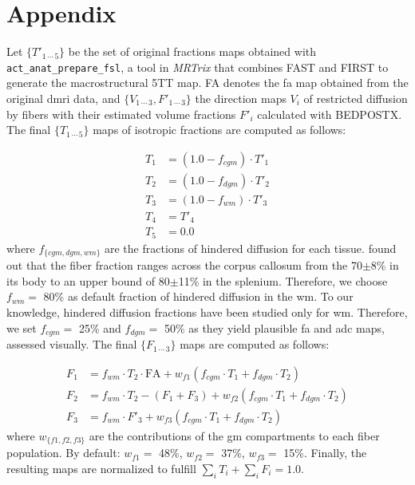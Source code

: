 \documentclass[english]{frontiers/frontiersSCNS} %
\begin{document}

\glsresetall
\linenumbers
\section*{Appendix}\label{sec:appendix}
Let $\{T'_{1\,\cdots\,5}\}$ be the set of original fractions maps obtained with \texttt{act\_anat\_prepare\_fsl}, a
  tool in \emph{MRTrix} that combines FAST \citep{zhang_segmentation_2001} and FIRST \citep{patenaude_bayesian_2011}
  to generate the macrostructural 5TT map.
FA denotes the \gls*{fa} map obtained from the original \gls*{dmri} data, and $\{V_{1\,\cdots\,3}, F'_{1\,\cdots\,3}\}$ the direction
  maps $V_i$ of restricted diffusion by fibers with their estimated volume fractions $F'_i$ calculated with BEDPOSTX.
The final $\{T_{1\,\cdots\,5}\}$ maps of isotropic fractions are computed as follows:

  \begin{align*}
  T_1 &= (1.0-f_{cgm}) \cdot T'_1 \\
  T_2 &= (1.0-f_{dgm}) \cdot T'_2 \\
  T_3 &= (1.0-f_{wm}) \cdot T'_3 \\
  T_4 &= T'_4 \\
  T_5 &= 0.0
  \end{align*}
where $f_{\{cgm, dgm, wm\}}$ are the fractions of hindered diffusion for each tissue.
\cite{sepehrband_brain_2015} found out that the fiber fraction ranges across the corpus
  callosum from the 70$\pm$8\% in its body to an upper bound of 80$\pm$11\% in the splenium.
Therefore, we choose $f_{wm} =$ 80\% as default fraction of hindered diffusion in the
  \gls*{wm}.
To our knowledge, hindered diffusion fractions have been studied only for \gls*{wm}.
Therefore, we set $f_{cgm} =$ 25\% and $f_{dgm} =$ 50\% as they yield plausible \gls*{fa}
  and \gls*{adc} maps, assessed visually.
The final $\{F_{1\,\cdots\,3}\}$ maps are computed as follows:

\begin{align*}
F_1 &= f_{wm} \cdot T_2 \cdot \text{FA} + w_{f1} (f_{cgm} \cdot T_1 + f_{dgm} \cdot T_2) \\
F_2 &= f_{wm} \cdot T_2 - (F_1 + F_3) + w_{f2} (f_{cgm} \cdot T_1 + f_{dgm} \cdot T_2) \\
F_3 &= f_{wm} \cdot F'_3 + w_{f3} (f_{cgm} \cdot T_1 + f_{dgm} \cdot T_2)
\end{align*}
where $w_{\{f1, f2, f3\}}$ are the contributions of the \gls*{gm} compartments to each fiber population.
By default: $w_{f1} = $ 48\%, $w_{f2} = $ 37\%, $w_{f3} = $ 15\%.
Finally, the resulting maps are normalized to fulfill $\sum_i T_i + \sum_i F_i = 1.0$.
\end{document}
